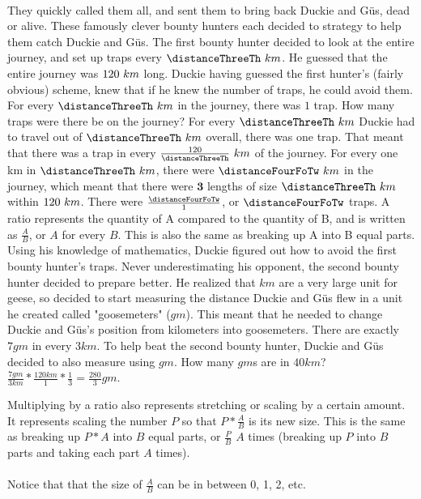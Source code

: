 \paragraph{} They quickly called them all, and sent them to bring back Duckie and G{\"u}s, dead or alive. These famously clever bounty hunters each decided to strategy to help them catch Duckie and G{\"u}s.
\vfill
\pagebreak
{The first bounty hunter decided to look at the entire journey, and set up traps every $\distanceThreeTh~km$. He guessed that the entire journey was $120~km$ long. Duckie having guessed the first hunter's (fairly obvious) scheme, knew that if he knew the number of traps, he could avoid them. For every $\distanceThreeTh~km$ in the journey, there was $1$ trap. How many traps were there be on the journey?}
{For every $\distanceThreeTh~km$ Duckie had to travel out of $\distanceThreeTh~km$ overall, there was one trap. That meant that there was a trap in every $\frac{\distanceFourFoO}{\distanceThreeTh}~km$ of the journey. For every one km in $\distanceThreeTh~km$, there were $\distanceFourFoTw~km$ in the journey, which meant that there were $\textbf{3}$ lengths of size $\distanceThreeTh~km$ within $120~km$. There were $\frac{\distanceFourFoTw}{1}$, or $\distanceFourFoTw$ traps.}
{A ratio represents the quantity of A compared to the quantity of B, and is written as $\frac{A}{B}$, or $A$ for every $B$. This is also the same as breaking up A into B equal parts.}
{}
{Using his knowledge of mathematics, Duckie figured out how to avoid the first bounty hunter's traps. Never underestimating his opponent, the second bounty hunter decided to prepare better. He realized that $km$ are a very large unit for geese, so decided to start measuring the distance Duckie and G{\"u}s flew in a unit he created called "goosemeters" ($gm$). This meant that he needed to change Duckie and G{\"u}s's position from kilometers into goosemeters. There are exactly $7 gm$ in every $3 km$. To help beat the second bounty hunter, Duckie and G{\"u}s decided to also measure using $gm$. How many $gm$s are in $40 km$?}
{$\frac{7 gm}{3 km}\ast\frac{120 km}{1}\ast\frac{1}{3}=\frac{280}{3} gm$.}
{Multiplying by a ratio also represents stretching or scaling by a certain amount. It represents scaling the number $P$ so that $P\ast\frac{A}{B}$ is its new size. This is the same as breaking up $P\ast A$ into $B$ equal parts, or $\frac{P}{B}$ $A$ times (breaking up $P$ into $B$ parts and taking each part $A$ times).\paragraph{} Notice that that the size of $\frac{A}{B}$ can be in between 0, 1, 2, etc.}
